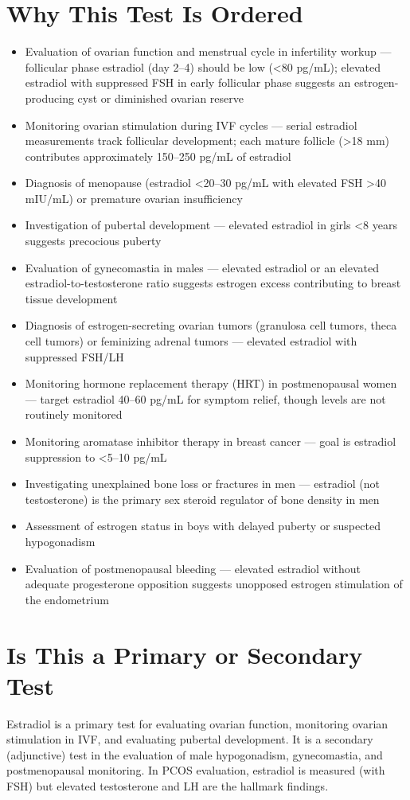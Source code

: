 \section*{Why This Test Is Ordered}
\begin{itemize}
  \item Evaluation of ovarian function and menstrual cycle in infertility workup --- follicular phase estradiol (day 2--4) should be low (<80 pg/mL); elevated estradiol with suppressed FSH in early follicular phase suggests an estrogen-producing cyst or diminished ovarian reserve
  \item Monitoring ovarian stimulation during IVF cycles --- serial estradiol measurements track follicular development; each mature follicle (>18 mm) contributes approximately 150--250 pg/mL of estradiol
  \item Diagnosis of menopause (estradiol <20--30 pg/mL with elevated FSH >40 mIU/mL) or premature ovarian insufficiency
  \item Investigation of pubertal development --- elevated estradiol in girls <8 years suggests precocious puberty
  \item Evaluation of gynecomastia in males --- elevated estradiol or an elevated estradiol-to-testosterone ratio suggests estrogen excess contributing to breast tissue development
  \item Diagnosis of estrogen-secreting ovarian tumors (granulosa cell tumors, theca cell tumors) or feminizing adrenal tumors --- elevated estradiol with suppressed FSH/LH
  \item Monitoring hormone replacement therapy (HRT) in postmenopausal women --- target estradiol 40--60 pg/mL for symptom relief, though levels are not routinely monitored
  \item Monitoring aromatase inhibitor therapy in breast cancer --- goal is estradiol suppression to <5--10 pg/mL
  \item Investigating unexplained bone loss or fractures in men --- estradiol (not testosterone) is the primary sex steroid regulator of bone density in men
  \item Assessment of estrogen status in boys with delayed puberty or suspected hypogonadism
  \item Evaluation of postmenopausal bleeding --- elevated estradiol without adequate progesterone opposition suggests unopposed estrogen stimulation of the endometrium
\end{itemize}

\section*{Is This a Primary or Secondary Test}
Estradiol is a primary test for evaluating ovarian function, monitoring ovarian stimulation in IVF, and evaluating pubertal development. It is a secondary (adjunctive) test in the evaluation of male hypogonadism, gynecomastia, and postmenopausal monitoring. In PCOS evaluation, estradiol is measured (with FSH) but elevated testosterone and LH are the hallmark findings.

